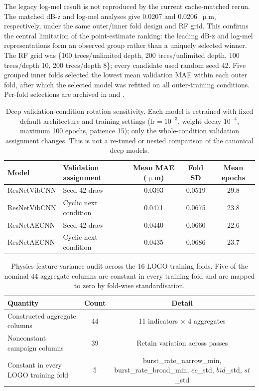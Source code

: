 The legacy log-mel result is not reproduced by the current cache-matched
rerun. The matched
dB-z and log-mel analyses give 0.0207 and 0.0206~\(\upmu\)m, respectively,
under the same outer/inner fold design and RF grid. This confirms the central
limitation of the point-estimate ranking: the leading dB-z and log-mel
representations form an observed group rather than a uniquely selected winner.
The RF grid was \{100 trees/unlimited depth, 200 trees/unlimited depth,
100 trees/depth 10, 200 trees/depth 8\}; every candidate used random seed
42. Five grouped inner folds selected the lowest mean validation MAE within
each outer fold, after which the selected model was refitted on all
outer-training conditions. Per-fold selections are archived in
 and
.







\begin{table}[htbp]
\centering
\caption{Deep validation-condition rotation sensitivity. Each model is
retrained with fixed default architecture and training settings
($\mathrm{lr}=10^{-3}$, weight decay $10^{-4}$, maximum 100 epochs,
patience 15); only the whole-condition validation assignment changes.
This is not a re-tuned or nested comparison of the canonical deep models.}
\label{tab:supp-deep-validation-rotation}
\begin{tabular}{@{}llccc@{}}
\toprule
Model & Validation assignment & Mean MAE (\(\upmu\)m) & Fold SD & Mean epochs \\
\midrule
ResNetVibCNN & Seed-42 draw & 0.0393 & 0.0519 & 29.8 \\
ResNetVibCNN & Cyclic next condition & 0.0471 & 0.0675 & 23.8 \\
ResNetAECNN & Seed-42 draw & 0.0440 & 0.0660 & 22.6 \\
ResNetAECNN & Cyclic next condition & 0.0435 & 0.0686 & 23.7 \\
\bottomrule
\end{tabular}
\end{table}

\begin{table}[htbp]
\centering
\caption{Physics-feature variance audit across the 16 LOGO training folds.
Five of the nominal 44 aggregate columns are constant in every training
fold and are mapped to zero by fold-wise standardisation.}
\label{tab:supp-physics-audit}
\begin{tabular}{@{}lcc@{}}
\toprule
Quantity & Count & Detail \\
\midrule
Constructed aggregate columns & 44 & 11 indicators $\times$ 4 aggregates \\
Nonconstant campaign columns & 39 & Retain variation across passes \\
Constant in every LOGO training fold & 5 & burst\_rate\_narrow\_min, burst\_rate\_broad\_min, $ec$\_std, $bid$\_std, $st$\_std \\
\bottomrule
\end{tabular}
\end{table}

